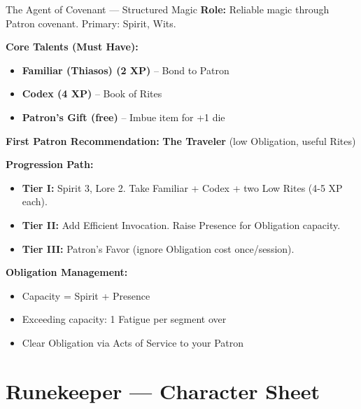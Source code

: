 \documentclass[10pt]{article}
\begin{document}
\begin{tipbox}{The Agent of Covenant --- Structured Magic}
    \textbf{Role:} Reliable magic through Patron covenant. Primary: Spirit, Wits.
    
    \textbf{Core Talents (Must Have):}
    \begin{itemize}
        \item \textbf{Familiar (Thiasos) (2 XP)} -- Bond to Patron
        \item \textbf{Codex (4 XP)} -- Book of Rites
        \item \textbf{Patron's Gift (free)} -- Imbue item for +1 die
    \end{itemize}
    
    \textbf{First Patron Recommendation:} \textbf{The Traveler} (low Obligation, useful Rites)
    
    \textbf{Progression Path:}
    \begin{itemize}
        \item \textbf{Tier I:} Spirit 3, Lore 2. Take Familiar + Codex + two Low Rites (4-5 XP each).
        \item \textbf{Tier II:} Add Efficient Invocation. Raise Presence for Obligation capacity.
        \item \textbf{Tier III:} Patron's Favor (ignore Obligation cost once/session).
    \end{itemize}
    
    \textbf{Obligation Management:}
    \begin{itemize}
        \item Capacity = Spirit + Presence
        \item Exceeding capacity: 1 Fatigue per segment over
        \item Clear Obligation via Acts of Service to your Patron
    \end{itemize}
\end{tipbox}

\newpage

\section*{Runekeeper --- Character Sheet}
\end{document}
